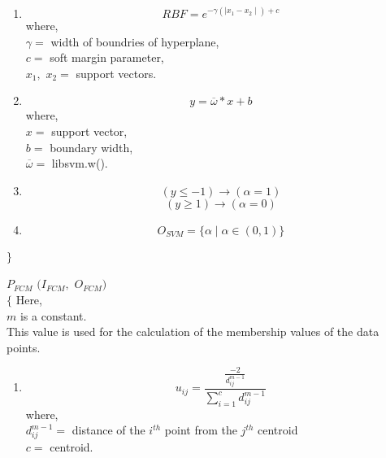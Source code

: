 \documentclass[12pt,a4paper,final]{report}
\begin{document}
{{{{{\begin{enumerate}

\item 
\begin{equation}
RBF = e^{-\gamma(\mid x_{1}-x_{2} \mid)+c}
\end{equation}
where, \\ $\gamma =$ width of boundries of hyperplane, \\ $c =$ soft margin parameter, \\ $x_{1}, $ $x_{2} =$ support vectors.


\item
\begin{equation}
y = \overline{\omega} * x + b
\end{equation}
where, \\ $x =$ support vector, \\ $b =$ boundary width, \\ $\overline{\omega} =$ libsvm.w().

\item
\begin{equation}
(y \leq -1) \rightarrow (\alpha = 1)
\end{equation}
\begin{equation}
(y \geq 1) \rightarrow (\alpha = 0)
\end{equation}

\item
\begin{equation}
O_{SVM} = \lbrace \alpha \mid \alpha \in (0, 1) \rbrace
\end{equation}

\end{enumerate}

$\\ \rbrace$

\newpage

\noindent
$P_{FCM} $ $ (I_{FCM},$ $O_{FCM})$\\
$\lbrace$
\indent
Here, \\
\indent $m$ is a constant.\\
\indent This value is used for the calculation of the membership values of the data points.\\


\begin{enumerate}

\item 
\begin{equation}
u_{ij} = \frac{\frac{-2}{d_{ij}^{m-1}}}{\sum_{i=1}^{c}{{d_{ij}^{m-1}}}}
\end{equation}
where, \\ $d_{ij}^{m-1}=$ distance of the $i^{th}$ point from the $j^{th}$ centroid\\
$c =$ centroid.


\end{enumerate}}}}}}
\end{document}
